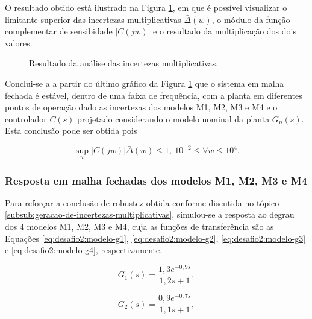 O resultado obtido está ilustrado na Figura
\ref{fig:desafio-2:resultado-questao-3-4}, em que é possível visualizar o
limitante superior das incertezas multiplicativas $\bar{\Delta}(w)$, o módulo da
função complementar de sensibidade $|\textit{C}(jw)|$ e o resultado da
multiplicação dos dois valores.

\begin{figure}[!ht]
    \caption{Resultado da análise das incertezas multiplicativas.}
    \vspace{-10pt}
    \hspace{-30pt}
    \label{fig:desafio-2:resultado-questao-3-4}
    \begin{minipage}{\linewidth}
        
    \end{minipage}
\end{figure}

Conclui-se a a partir do último gráfico da Figura
\ref{fig:desafio-2:resultado-questao-3-4} que o sistema em malha fechada é
estável, dentro de uma faixa de frequência, com a planta em diferentes pontos de
operação dado as incertezas dos modelos M1, M2, M3 e M4 e o controlador $C(s)$
projetado considerando o modelo nominal da planta $G_{n}(s)$. Esta conclusão
pode ser obtida pois

\begin{equation}
    \label{eq:desafio-2:principio-do-modelo-interno}
    \sup_{w}|\textit{C}(jw)|\bar{\Delta}(w) \le 1, \ 10^{-2} \leq \forall w \leq {10^{4}}.
\end{equation}

\subsubsection{Resposta em malha fechadas dos modelos M1, M2, M3 e M4}
\label{subsub:desafio2:resposta-em-malha-fechadas-dos-modelos-m1-m2-m3-e-m4}
Para reforçar a conclusão de robustez obtida conforme discutida no tópico
\ref{subsub:geracao-de-incertezas-multiplicativas}, simulou-se a resposta ao
degrau dos 4 modelos M1, M2, M3 e M4, cuja as funções de transferência são as
Equações \ref{eq:desafio2:modelo-g1}, \ref{eq:desafio2:modelo-g2},
\ref{eq:desafio2:modelo-g3} e \ref{eq:desafio2:modelo-g4}, respectivamente.

\begin{equation}
    \label{eq:desafio2:modelo-g1}
    G_{1}(s) = \frac{1,3e^{-0,9s}}{1,2s + 1},
\end{equation}

\begin{equation}
    \label{eq:desafio2:modelo-g2}
    G_{2}(s) = \frac{0,9e^{-0,7s}}{1,1s + 1},
\end{equation}

